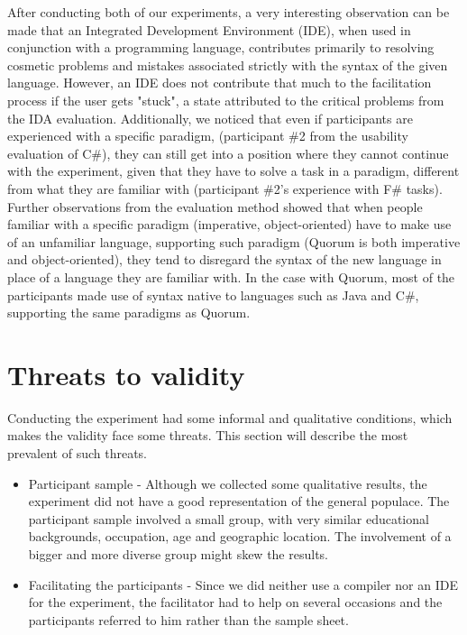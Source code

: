 \documentclass[preprint,10pt]{sigplanconf}
\begin{document}
After conducting both of our experiments, a very interesting observation can be made that an Integrated Development Environment (IDE), when used in conjunction with a programming language, contributes primarily to resolving cosmetic problems and mistakes associated strictly with the syntax of the given language. However, an IDE does not contribute that much to the facilitation process if the user gets "stuck", a state attributed to the critical problems from the IDA evaluation. Additionally, we noticed that even if participants are experienced with a specific paradigm, (participant \#2 from the usability evaluation of C\#), 
they can still get into a position where they cannot continue with the experiment, given that they have to solve a task in a paradigm, different from what they are familiar with (participant \#2's experience with F\# tasks). Further observations from the evaluation method showed that when people familiar with a specific paradigm (imperative, object-oriented) have to make use of an unfamiliar language, supporting such paradigm (Quorum is both imperative and object-oriented), they tend to disregard the syntax of the new language in place of a language they are familiar with. In the case with Quorum, most of the participants %
made use of syntax native to languages such as Java and C\#, supporting the same paradigms as Quorum.

\section{Threats to validity}
Conducting the experiment had some informal and qualitative conditions, which makes the validity face some threats. This section will describe the most prevalent of such threats.
\begin{itemize}
\item Participant sample - Although we collected some qualitative results, the experiment did not have a good representation of the general populace. The participant sample involved a small group, with very similar educational backgrounds, occupation, age and geographic location. The involvement of a bigger and more diverse group might skew the results.
\item Facilitating the participants - Since we did neither use a compiler nor an IDE for the experiment, the facilitator had to help on several occasions and the participants referred to him rather than the sample sheet.
\end{itemize}
\end{document}
